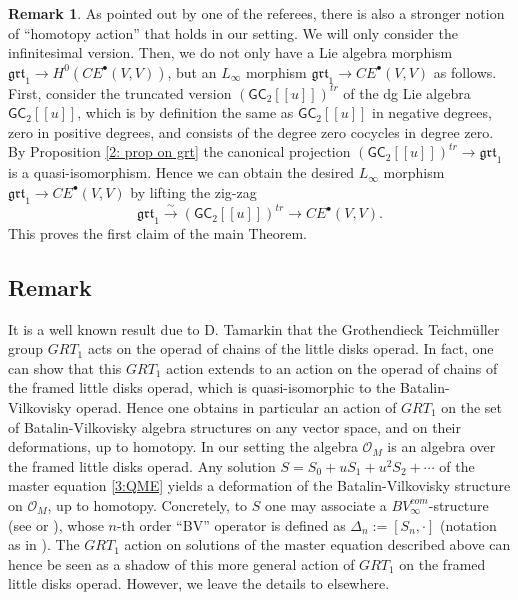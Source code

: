 \documentclass{amsart}
\theoremstyle{plain}
\theoremstyle{definition}
\newtheorem{remark}[theorem]{Remark}
\begin{document}
\begin{remark}
 As pointed out by one of the referees, there is also a stronger notion of ``homotopy action'' that holds in our setting. We will only consider the infinitesimal version.
 Then, we do not only have a Lie algebra morphism ${{\mathfrak{{grt}}}_1}\to H^0\left(CE^{\bullet}(V,V)\right)$, but an $L_\infty$ morphism ${{\mathfrak{{grt}}}_1}\to CE^{\bullet}(V,V)$ as follows. First, consider the truncated version $\left({{\mathsf G}}{{\mathsf C}}_2[[{u}]]\right)^{tr}$ of the dg Lie algebra ${{\mathsf G}}{{\mathsf C}}_2[[{u}]]$, which is by definition the same as ${{\mathsf G}}{{\mathsf C}}_2[[{u}]]$ in negative degrees, zero in positive degrees, and consists of the degree zero cocycles in degree zero. By Proposition {\ref{2: prop on grt}} the canonical projection $\left({{\mathsf G}}{{\mathsf C}}_2[[{u}]]\right)^{tr}\to {{\mathfrak{{grt}}}_1}$ is a quasi-isomorphism. Hence we can obtain the desired $L_\infty$ morphism ${{\mathfrak{{grt}}}_1}\to CE^{\bullet}(V,V)$ by lifting the zig-zag
 \[
  {{\mathfrak{{grt}}}_1} \stackrel{\sim}{\longrightarrow} \left({{\mathsf G}}{{\mathsf C}}_2[[{u}]]\right)^{tr} {\longrightarrow} CE^{\bullet}(V,V).
 \]
 This proves the first claim of the main Theorem.
\end{remark}

\subsection{Remark}
It is a well known result due to D. Tamarkin \cite{T} that the Grothendieck Teichm\"uller group ${GRT_1}$ acts on the operad of chains of the little disks operad.
In fact, one can show that this ${GRT_1}$ action extends to an action on the operad of chains of the framed little disks operad, which is quasi-isomorphic to the Batalin-Vilkovisky operad. Hence one obtains in particular an action of ${GRT_1}$ on the set of Batalin-Vilkovisky algebra structures on any vector space, and on their deformations, up to homotopy.
In our setting the algebra ${{\mathcal O}}_M$ is an algebra over the framed little disks operad. Any solution $S=S_0+u S_1+u^2 S_2+\cdots$ of the master equation \eqref{3:QME} yields a deformation of the Batalin-Vilkovisky structure on ${{\mathcal O}}_M$, up to homotopy. Concretely, to $S$ one may associate a $BV_\infty^{com}$-structure (see \cite{Kr} or \cite[section 5.3]{CMW}), whose $n$-th order ``BV'' operator is defined as $\Delta_n := [S_n,\cdot]$ (notation as in \cite[section 5.3]{CMW}).
The ${GRT_1}$ action on solutions of the master equation described above can hence be seen as a shadow of this more general action of ${GRT_1}$ on the framed little disks operad.
However, we leave the details to elsewhere.
\end{document}
